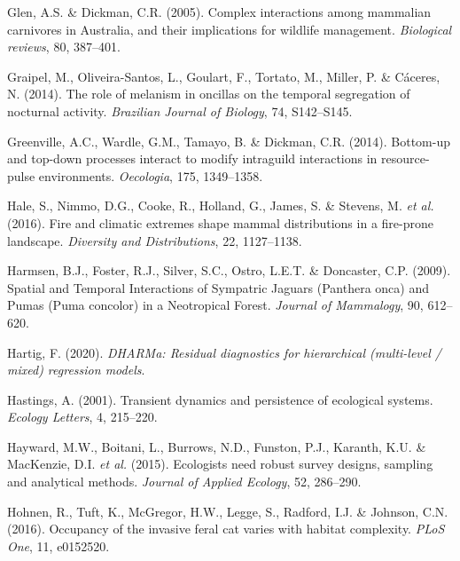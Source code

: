 \documentclass[11pt,a4paper,titlepage,twoside,openright]{style/unimelbthesis}
\begin{document}
\begin{mainmatter}
\leavevmode\hypertarget{ref-glen2005complex}{}%
Glen, A.S. \& Dickman, C.R. (2005). Complex interactions among mammalian carnivores in Australia, and their implications for wildlife management. \emph{Biological reviews}, 80, 387--401.

\leavevmode\hypertarget{ref-graipel2014role}{}%
Graipel, M., Oliveira-Santos, L., Goulart, F., Tortato, M., Miller, P. \& Cáceres, N. (2014). The role of melanism in oncillas on the temporal segregation of nocturnal activity. \emph{Brazilian Journal of Biology}, 74, S142--S145.

\leavevmode\hypertarget{ref-greenville2014bottom}{}%
Greenville, A.C., Wardle, G.M., Tamayo, B. \& Dickman, C.R. (2014). Bottom-up and top-down processes interact to modify intraguild interactions in resource-pulse environments. \emph{Oecologia}, 175, 1349--1358.

\leavevmode\hypertarget{ref-https:ux2fux2fdoi.orgux2f10.1111ux2fddi.12471}{}%
Hale, S., Nimmo, D.G., Cooke, R., Holland, G., James, S. \& Stevens, M. \emph{et al.} (2016). Fire and climatic extremes shape mammal distributions in a fire-prone landscape. \emph{Diversity and Distributions}, 22, 1127--1138.

\leavevmode\hypertarget{ref-harmsen2009spatial}{}%
Harmsen, B.J., Foster, R.J., Silver, S.C., Ostro, L.E.T. \& Doncaster, C.P. (2009). Spatial and Temporal Interactions of Sympatric Jaguars (Panthera onca) and Pumas (Puma concolor) in a Neotropical Forest. \emph{Journal of Mammalogy}, 90, 612--620.

\leavevmode\hypertarget{ref-DHARMa}{}%
Hartig, F. (2020). \emph{DHARMa: Residual diagnostics for hierarchical (multi-level / mixed) regression models}.

\leavevmode\hypertarget{ref-hastings2001transient}{}%
Hastings, A. (2001). Transient dynamics and persistence of ecological systems. \emph{Ecology Letters}, 4, 215--220.

\leavevmode\hypertarget{ref-hayward2015ecologists}{}%
Hayward, M.W., Boitani, L., Burrows, N.D., Funston, P.J., Karanth, K.U. \& MacKenzie, D.I. \emph{et al.} (2015). Ecologists need robust survey designs, sampling and analytical methods. \emph{Journal of Applied Ecology}, 52, 286--290.

\leavevmode\hypertarget{ref-hohnen2016occupancy}{}%
Hohnen, R., Tuft, K., McGregor, H.W., Legge, S., Radford, I.J. \& Johnson, C.N. (2016). Occupancy of the invasive feral cat varies with habitat complexity. \emph{PLoS One}, 11, e0152520.


\end{mainmatter}
\end{document}
